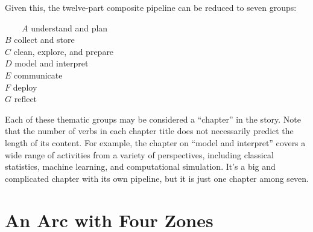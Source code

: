 \documentclass[
  letterpaper,
]{report}
\begin{document}
Given this, the twelve-part composite pipeline can be reduced to seven
groups:

~~~~\(A\) understand and plan\\
\hspace*{0.333em}\hspace*{0.333em}\hspace*{0.333em}\hspace*{0.333em}\(B\)
collect and store\\
\hspace*{0.333em}\hspace*{0.333em}\hspace*{0.333em}\hspace*{0.333em}\(C\)
clean, explore, and prepare\\
\hspace*{0.333em}\hspace*{0.333em}\hspace*{0.333em}\hspace*{0.333em}\(D\)
model and interpret\\
\hspace*{0.333em}\hspace*{0.333em}\hspace*{0.333em}\hspace*{0.333em}\(E\)
communicate\\
\hspace*{0.333em}\hspace*{0.333em}\hspace*{0.333em}\hspace*{0.333em}\(F\)
deploy\\
\hspace*{0.333em}\hspace*{0.333em}\hspace*{0.333em}\hspace*{0.333em}\(G\)
reflect

Each of these thematic groups may be considered a ``chapter'' in the
story. Note that the number of verbs in each chapter title does not
necessarily predict the length of its content. For example, the chapter
on ``model and interpret'' covers a wide range of activities from a
variety of perspectives, including classical statistics, machine
learning, and computational simulation. It's a big and complicated
chapter with its own pipeline, but it is just one chapter among seven.

\hypertarget{an-arc-with-four-zones}{%
\chapter{An Arc with Four Zones}\label{an-arc-with-four-zones}}
\end{document}
